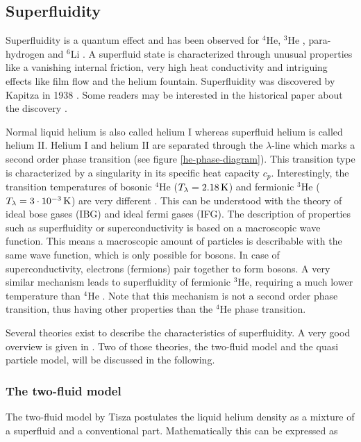 \documentclass[parskip,12pt,headsepline,a4paper] {scrbook}
\begin{document}
\subsection{Superfluidity}
\vspace{-1\baselineskip}
Superfluidity is a quantum effect and has been observed for $^4$He, $^3$He \cite{only-superfluid}, para-hydrogen \cite{superh} and $^6$Li \cite{superli}. A superfluid state is characterized through unusual properties like a vanishing internal friction, very high heat conductivity and intriguing effects like film flow and the helium fountain. Superfluidity was discovered by Kapitza in 1938 \cite{kapitza}. Some readers may be interested in the historical paper about the discovery \cite{super-story}.

Normal liquid helium is also called helium I whereas superfluid helium is called helium II. Helium I and helium II are separated through the $\lambda$-line which marks a second order phase transition (see figure \ref{he-phase-diagram}). This transition type is characterized by a singularity in its specific heat capacity $c_p$. Interestingly, the transition temperatures of bosonic $^4$He ($T_\lambda = \unit[2.18]{K}$) and fermionic $^3$He ($T_\lambda = \unit[3\cdot10^{-3}]{K}$) are very different \cite{toennis}. This can be understood with the theory of ideal bose gases (IBG) and ideal fermi gases (IFG). The description of properties such as superfluidity or superconductivity is based on a macroscopic wave function. This means a macroscopic amount of particles is describable with the same wave function, which is only possible for bosons. In case of superconductivity, electrons (fermions) pair together to form bosons. A very similar mechanism leads to superfluidity of fermionic $^3$He, requiring a much lower temperature than $^4$He \cite{fliessbach}. Note that this mechanism is not a second order phase transition, thus having other properties than the $^4$He phase transition.

Several theories exist to describe the characteristics of superfluidity. A very good overview is given in \cite{fliessbach}. Two of those theories, the two-fluid model and the quasi particle model, will be discussed in the following.

\subsubsection{The two-fluid model}
\vspace{-1\baselineskip}
The two-fluid model by Tisza \cite{tisza} postulates the liquid helium density as a mixture of a superfluid and a conventional part. Mathematically this can be expressed as
\end{document}
